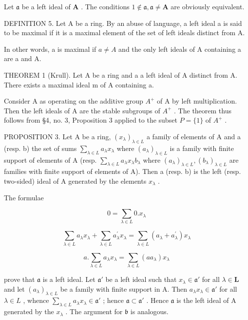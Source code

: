 Let \(\mathfrak{a}\) be a left ideal of \(\mathbf{A}\) . The conditions \(1 \notin \mathfrak{a}, \mathfrak{a} \neq \mathbf{A}\) are obviously equivalent.

DEFINITION 5. Let A be a ring. By an abuse of language, a left ideal a is said to be maximal if it is a maximal element of the set of left ideals distinct from A.

In other words, a is maximal if \(a \neq A\) and the only left ideals of A containing a are a and A.

THEOREM 1 (Krull). Let A be a ring and a a left ideal of A distinct from A. There exists a maximal ideal m of A containing a.

Consider A as operating on the additive group \(A^{+}\) of A by left multiplication. Then the left ideals of A are the stable subgroups of \(A^{+}\) . The theorem thus follows from §4, no. 3, Proposition 3 applied to the subset \(P = \{1\}\) of \(A^{+}\) .

PROPOSITION 3. Let A be a ring, \((x_{\lambda})_{\lambda \in L}\) a family of elements of A and a (resp. b) the set of sums \(\sum_{\lambda \in L} a_{\lambda} x_{\lambda}\) where \((a_{\lambda})_{\lambda \in L}\) is a family with finite support of elements of A (resp. \(\sum_{\lambda \in L} a_{\lambda} x_{\lambda} b_{\lambda}\) where \((a_{\lambda})_{\lambda \in L}, (b_{\lambda})_{\lambda \in L}\) are families with finite support of elements of A). Then a (resp. b) is the left (resp. two-sided) ideal of A generated by the elements \(x_{\lambda}\) .

The formulae

\[
0 = \sum_ {\lambda \in L} 0. x _ {\lambda}\tag{18}
\]

\[
\sum_ {\lambda \in L} a _ {\lambda} x _ {\lambda} + \sum_ {\lambda \in L} a _ {\lambda} ^ {\prime} x _ {\lambda} = \sum_ {\lambda \in L} (a _ {\lambda} + a _ {\lambda} ^ {\prime}) x _ {\lambda}\tag{19}
\]

\[
a. \sum_ {\lambda \in L} a _ {\lambda} x _ {\lambda} = \sum_ {\lambda \in L} (a a _ {\lambda}) x _ {\lambda}\tag{20}
\]

prove that \(\mathfrak{a}\) is a left ideal. Let \(\mathfrak{a}'\) be a left ideal such that \(x_{\lambda} \in \mathfrak{a}'\) for all \(\lambda \in \mathbf{L}\) and let \((a_{\lambda})_{\lambda \in L}\) be a family with finite support in A. Then \(a_{\lambda}x_{\lambda}\in \mathfrak{a}'\) for all \(\lambda \in L\) , whence \(\sum_{\lambda \in L}a_{\lambda}x_{\lambda}\in \mathfrak{a}'\) ; hence \(\mathfrak{a}\subset \mathfrak{a}'\) . Hence \(\mathfrak{a}\) is the left ideal of A generated by the \(x_{\lambda}\) . The argument for \(\mathfrak{b}\) is analogous.

